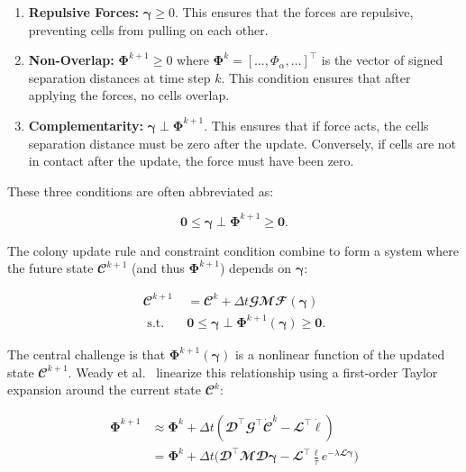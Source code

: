 \documentclass[conference]{IEEEtran}
\begin{document}
\begin{enumerate}
    \item \textbf{Repulsive Forces:} $\boldsymbol{\gamma} \geq 0$. This ensures that the forces are repulsive, preventing cells from pulling on each other.
    \item \textbf{Non-Overlap:} $\mathbf{\Phi}^{k+1} \geq 0$ where $\mathbf{\Phi}^k = [\dots, \Phi_\alpha, \dots]^\top$ is the vector of signed separation distances at time step $k$. This condition ensures that after applying the forces, no cells overlap.
    \item   \textbf{Complementarity:} $\boldsymbol{\gamma} \perp \mathbf{\Phi}^{k+1}$. This ensures  that if force acts, the cells separation distance must be zero after the update. Conversely, if cells are not in contact after the update, the force must have been zero.
\end{enumerate}

These three conditions are often abbreviated as:

\begin{equation}
    \mathbf{0} \leq \boldsymbol{\gamma} \perp \mathbf{\Phi}^{k+1} \geq \mathbf{0}.
\end{equation}


The colony update rule and constraint condition combine to form a system where the future state $\mathbfcal{C}^{k+1}$ (and thus $\mathbf{\Phi}^{k+1}$) depends on $\boldsymbol{\gamma}$:

\begin{equation} \label{eq:colony_update_with_constraints}
    \begin{split}
        \mathbfcal{C}^{k+1} & = \mathbfcal{C}^k + \Delta t \mathbfcal{G} \mathbfcal{M} \mathbfcal{F}(\boldsymbol{\gamma})         \\
        \text{ s.t.} \quad  & \mathbf{0} \leq \boldsymbol{\gamma} \perp \mathbf{\Phi}^{k+1}(\boldsymbol{\gamma}) \geq \mathbf{0}.
    \end{split}
\end{equation}

The central challenge is that $\mathbf{\Phi}^{k+1}(\boldsymbol{\gamma})$ is a nonlinear function of the updated state $\mathbfcal{C}^{k+1}$. Weady et al.~\cite{Weady2024} linearize this relationship using a first-order Taylor expansion around the current state $\mathbfcal{C}^k$:

\begin{equation}\label{eq:phi_expanded}
    \begin{split}
        \mathbf{\Phi}^{k+1} & \approx \mathbf{\Phi}^k + \Delta t \left( \mathbfcal{D}^\top  \mathbfcal{G}^\top  \dot{\mathbfcal{C}}^k - \mathbfcal{L}^\top\dot{\boldsymbol{\ell}} \right)\\
        & = \mathbf{\Phi}^k + \Delta t \Biggl( \mathbfcal{D}^\top
        \mathbfcal{M} \mathbfcal{D} \boldsymbol{\gamma}   - \mathbfcal{L}^\top  \frac{\boldsymbol{\ell}} {\tau} e^{-\lambda \mathbfcal{L} \boldsymbol{\gamma } } \Biggr)
    \end{split}
\end{equation}
\end{document}
